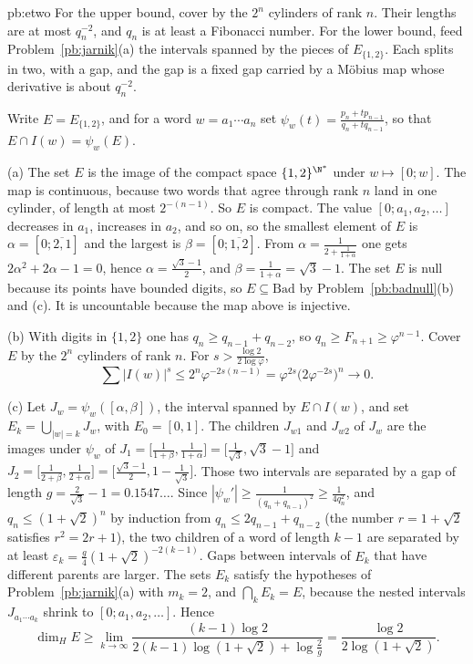 \begin{solution}{pb:etwo}
\idea For the upper bound, cover by the $2^n$ cylinders of rank $n$. Their lengths are at most $q_n^{-2}$, and $q_n$ is at least a Fibonacci number. For the lower bound, feed Problem~\ref{pb:jarnik}(a) the intervals spanned by the pieces of $E_{\{1,2\}}$. Each splits in two, with a gap, and the gap is a fixed gap carried by a Möbius map whose derivative is about $q_n^{-2}$.

\writeup Write $E=E_{\{1,2\}}$, and for a word $w=a_1\cdots a_n$ set $\psi_w(t)=\frac{p_n+tp_{n-1}}{q_n+tq_{n-1}}$, so that $E\cap I(w)=\psi_w(E)$.

(a) The set $E$ is the image of the compact space $\{1,2\}^{\N^*}$ under $w\mapsto[0;w]$. The map is continuous, because two words that agree through rank $n$ land in one cylinder, of length at most $2^{-(n-1)}$. So $E$ is compact. The value $[0;a_1,a_2,\dots]$ decreases in $a_1$, increases in $a_2$, and so on, so the smallest element of $E$ is $\alpha=[0;\overline{2,1}]$ and the largest is $\beta=[0;\overline{1,2}]$. From $\alpha=\frac1{2+\frac1{1+\alpha}}$ one gets $2\alpha^2+2\alpha-1=0$, hence $\alpha=\frac{\sqrt3-1}2$, and $\beta=\frac1{1+\alpha}=\sqrt3-1$. The set $E$ is null because its points have bounded digits, so $E\subseteq\mathrm{Bad}$ by Problem~\ref{pb:badnull}(b) and (c). It is uncountable because the map above is injective.

(b) With digits in $\{1,2\}$ one has $q_n\ge q_{n-1}+q_{n-2}$, so $q_n\ge F_{n+1}\ge\varphi^{n-1}$. Cover $E$ by the $2^n$ cylinders of rank $n$. For $s>\frac{\log 2}{2\log\varphi}$,
\[
\sum|I(w)|^s\le 2^n\varphi^{-2s(n-1)}=\varphi^{2s}\bigl(2\varphi^{-2s}\bigr)^n\to 0.
\]

(c) Let $J_w=\psi_w([\alpha,\beta])$, the interval spanned by $E\cap I(w)$, and set $E_k=\bigcup_{|w|=k}J_w$, with $E_0=[0,1]$. The children $J_{w1}$ and $J_{w2}$ of $J_w$ are the images under $\psi_w$ of $J_1=\bigl[\frac1{1+\beta},\frac1{1+\alpha}\bigr]=\bigl[\frac1{\sqrt3},\sqrt3-1\bigr]$ and $J_2=\bigl[\frac1{2+\beta},\frac1{2+\alpha}\bigr]=\bigl[\frac{\sqrt3-1}2,1-\frac1{\sqrt3}\bigr]$. Those two intervals are separated by a gap of length $g=\frac2{\sqrt3}-1=0.1547\ldots$. Since $|\psi_w'|\ge\frac1{(q_n+q_{n-1})^2}\ge\frac1{4q_n^2}$, and $q_n\le(1+\sqrt2)^n$ by induction from $q_n\le 2q_{n-1}+q_{n-2}$ (the number $r=1+\sqrt2$ satisfies $r^2=2r+1$), the two children of a word of length $k-1$ are separated by at least $\varepsilon_k=\frac g4(1+\sqrt2)^{-2(k-1)}$. Gaps between intervals of $E_k$ that have different parents are larger. The sets $E_k$ satisfy the hypotheses of Problem~\ref{pb:jarnik}(a) with $m_k=2$, and $\bigcap_k E_k=E$, because the nested intervals $J_{a_1\cdots a_k}$ shrink to $[0;a_1,a_2,\dots]$. Hence
\[
\dim_HE\ge\lim_{k\to\infty}\frac{(k-1)\log 2}{2(k-1)\log(1+\sqrt2)+\log\frac2g}=\frac{\log 2}{2\log(1+\sqrt2)}.
\]


\end{solution}
